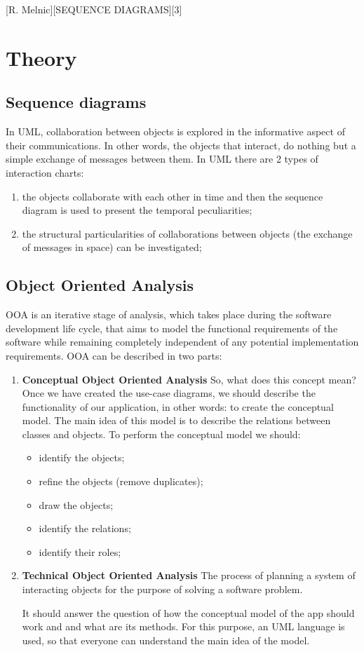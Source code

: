 \documentclass{article}
\begin{document}
	[R. Melnic][SEQUENCE DIAGRAMS][3]

	\section{Theory}
		\subsection{Sequence diagrams}
			In UML, collaboration between objects is explored in the informative aspect of their communications. In other words, the objects that interact, do nothing but a simple exchange of messages between them. In UML there are 2 types of interaction charts:
			\begin{enumerate}
				\item the objects collaborate with each other in time and then  the sequence diagram is used to present the temporal peculiarities;

				\item the structural particularities of collaborations between objects (the exchange of messages in space) can be investigated;
			\end{enumerate}

		\subsection{Object Oriented Analysis}
			OOA is an iterative stage of analysis, which takes place during the software development life cycle, that aims to model the functional requirements of the software while remaining completely independent of any potential implementation requirements. OOA can be described in two parts:
			\begin{enumerate}
				\item \textbf{Conceptual Object Oriented Analysis}
				So, what does this concept mean?
				Once we have created the use-case diagrams, we should describe the functionality of our application, in other words: to create the conceptual model. The main idea of this model is to describe the relations between classes and objects. To perform the conceptual model we should:
				\begin{itemize}
					\item identify the objects;
					\item refine the objects (remove duplicates);
					\item draw the objects;
					\item identify the relations;
					\item identify their roles;
				\end{itemize}

				\item \textbf{Technical Object Oriented Analysis}
				The process of planning a system of interacting objects for the purpose of solving a software problem.

				It should answer the question of how the conceptual model of the app should work and and what are its methods. For this purpose, an UML language is used, so that everyone can understand the main idea of the model.
			\end{enumerate}
\end{document}
